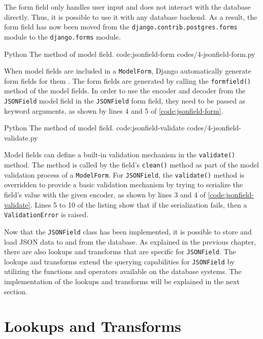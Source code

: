 The form field only handles user input and does not interact with the database
directly. Thus, it is possible to use it with any database backend. As a
result, the form field has now been moved from the
\verb|django.contrib.postgres.forms| module to the \verb|django.forms| module.

\listing
{Python}
{The  method of  model field.}
{code:jsonfield-form}
{codes/4-jsonfield-form.py}

When model fields are included in a \verb|ModelForm|, Django automatically
generate form fields for them \cite{django:modelform}. The form fields are
generated by calling the \verb|formfield()| method of the model fields. In
order to use the encoder and decoder from the \verb|JSONField| model field in
the \verb|JSONField| form field, they need to be passed as keyword arguments,
as shown by lines 4 and 5 of \autoref{code:jsonfield-form}.

\listing
{Python}
{The  method of  model field.}
{code:jsonfield-validate}
{codes/4-jsonfield-validate.py}

Model fields can define a built-in validation mechanism in the
\verb|validate()| method. The method is called by the field's \verb|clean()|
method as part of the model validation process of a \verb|ModelForm|. For
\verb|JSONField|, the \verb|validate()| method is overridden to provide a
basic validation mechanism by trying to serialize the field's value with the
given encoder, as shown by lines 3 and 4 of \autoref{code:jsonfield-validate}.
Lines 5 to 10 of the listing show that if the serialization fails, then a
\verb|ValidationError| is raised.

Now that the \verb|JSONField| class has been implemented, it is possible to
store and load JSON data to and from the database. As explained in the previous
chapter, there are also lookups and transforms that are specific for
\verb|JSONField|. The lookups and transforms extend the querying capabilities
for \verb|JSONField| by utilizing the functions and operators available on the
database systems. The implementation of the lookups and transforms will be
explained in the next section.

\section{ Lookups and Transforms}

